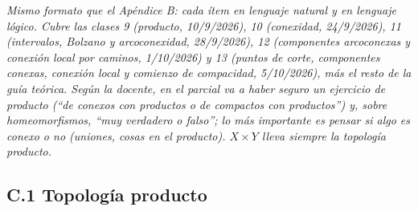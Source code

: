 \documentclass[11pt,a4paper]{article}
\theoremstyle{definition}
\theoremstyle{plain}
\begin{document}
\noindent\emph{Mismo formato que el Apéndice B: cada ítem en lenguaje natural y en lenguaje lógico. Cubre las clases 9 (producto, 10/9/2026), 10 (conexidad, 24/9/2026), 11 (intervalos, Bolzano y arcoconexidad, 28/9/2026), 12 (componentes arcoconexas y conexión local por caminos, 1/10/2026) y 13 (puntos de corte, componentes conexas, conexión local y comienzo de compacidad, 5/10/2026), más el resto de la guía teórica. Según la docente, en el parcial va a haber seguro un ejercicio de producto (``de conexos con productos o de compactos con productos'') y, sobre homeomorfismos, ``muy verdadero o falso''; lo más importante es pensar si algo es conexo o no (uniones, cosas en el producto). $X\times Y$ lleva siempre la topología producto.}

\subsection*{C.1 Topología producto}
\end{document}
